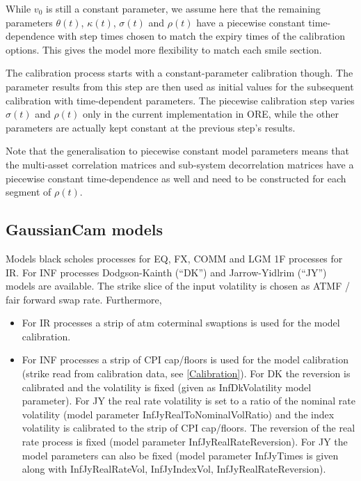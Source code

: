 While $v_0$ is still a constant parameter, we assume here that the remaining parameters $\theta(t)$, $\kappa(t)$,
$\sigma(t)$ and $\rho(t)$ have a piecewise constant time-dependence with step times chosen to match the expiry
times of the calibration options. This gives the model more flexibility to match each smile section. 

The calibration process starts with a constant-parameter calibration though. The parameter results from this step
are then used as initial values for the subsequent calibration with time-dependent parameters.
The piecewise calibration step varies $\sigma(t)$ and $\rho(t)$ only in the current implementation in ORE,
while the other parameters are actually kept constant at the previous step's results.

Note that the generalisation to piecewise constant model parameters means that the multi-asset correlation matrices and
sub-system decorrelation matrices have a piecewise constant time-dependence as well and need to be constructed for each segment
of $\rho(t)$. 

\subsection{GaussianCam models}

Models black scholes processes for EQ, FX, COMM and LGM 1F processes for IR. For INF processes Dodgson-Kainth (``DK'')
and Jarrow-Yidlrim (``JY'') models are available. The strike slice of the input volatility is chosen as ATMF / fair
forward swap rate. Furthermore,

\begin{itemize}
\item For IR processes a strip of atm coterminal swaptions is used for the model calibration.
\item For INF processes a strip of CPI cap/floors is used for the model calibration (strike read from calibration data,
  see \ref{Calibration}). For DK the reversion is calibrated and the volatility is fixed (given as InfDkVolatility model
  parameter). For JY the real rate volatility is set to a ratio of the nominal rate volatility (model parameter
  InfJyRealToNominalVolRatio) and the index volatility is calibrated to the strip of CPI cap/floors. The reversion of
  the real rate process is fixed (model parameter InfJyRealRateReversion). For JY the model parameters can also be fixed
  (model parameter InfJyTimes is given along with InfJyRealRateVol, InfJyIndexVol, InfJyRealRateReversion).
\end{itemize}

